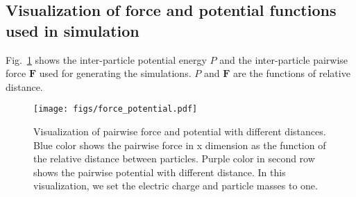 \documentclass{article}
\newcommand{\potEnergy}{P}
\newcommand{\force}{\bm{F}}
\begin{document}
\subsection{Visualization of force and potential functions used in simulation}
\label{sec:force-potential-functions-visualization}
Fig.~\ref{fig:force-potential-functions-plot} shows the inter-particle potential energy $\potEnergy$ and the inter-particle pairwise force $\force$ used for generating the simulations. $\potEnergy$ and $\force$ are the functions of relative distance.

\begin{figure}[h!]
    \centering
    \texttt{[image: figs/force\_potential.pdf]}
    \caption{Visualization of pairwise force and potential with different distances. Blue color shows the pairwise force in x dimension as the function of the relative distance between particles. Purple color in second row shows the pairwise potential with different distance. In this visualization, we set the electric charge and particle masses to one. }
    \label{fig:force-potential-functions-plot}
\end{figure}

\clearpage
\end{document}
